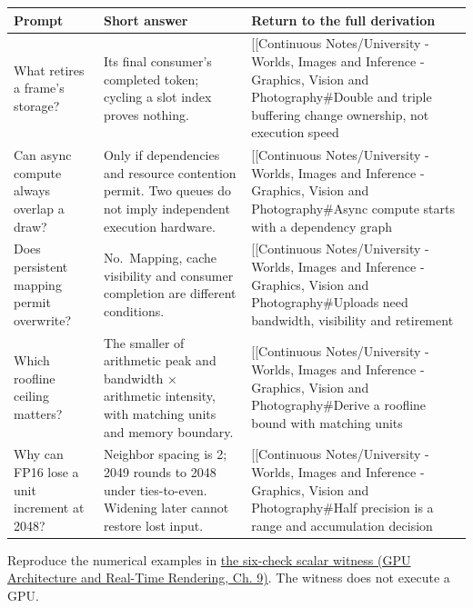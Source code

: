 \hypertarget{appendix-a8f634b076b5-buffering-budget-and-precision-in-five-answers}{}

{\def\LTcaptype{none} %
\begin{longtable}[]{@{}
  >{\raggedright\arraybackslash}p{}
  >{\raggedright\arraybackslash}p{}
  >{\raggedright\arraybackslash}p{}@{}}
\toprule\noalign{}
\begin{minipage}[b]{\linewidth}\raggedright
Prompt
\end{minipage} & \begin{minipage}[b]{\linewidth}\raggedright
Short answer
\end{minipage} & \begin{minipage}[b]{\linewidth}\raggedright
Return to the full derivation
\end{minipage} \\
\midrule\noalign{}
\endhead
\bottomrule\noalign{}
\endlastfoot
What retires a frame's storage? & Its final consumer's completed token; cycling a slot index proves nothing. & {[}{[}Continuous Notes/University - Worlds, Images and Inference - Graphics, Vision and Photography\#Double and triple buffering change ownership, not execution speed \\
Can async compute always overlap a draw? & Only if dependencies and resource contention permit. Two queues do not imply independent execution hardware. & {[}{[}Continuous Notes/University - Worlds, Images and Inference - Graphics, Vision and Photography\#Async compute starts with a dependency graph \\
Does persistent mapping permit overwrite? & No.~Mapping, cache visibility and consumer completion are different conditions. & {[}{[}Continuous Notes/University - Worlds, Images and Inference - Graphics, Vision and Photography\#Uploads need bandwidth, visibility and retirement \\
Which roofline ceiling matters? & The smaller of arithmetic peak and bandwidth × arithmetic intensity, with matching units and memory boundary. & {[}{[}Continuous Notes/University - Worlds, Images and Inference - Graphics, Vision and Photography\#Derive a roofline bound with matching units \\
Why can FP16 lose a unit increment at 2048? & Neighbor spacing is 2; 2049 rounds to 2048 under ties-to-even. Widening later cannot restore lost input. & {[}{[}Continuous Notes/University - Worlds, Images and Inference - Graphics, Vision and Photography\#Half precision is a range and accumulation decision \\
\end{longtable}
}

Reproduce the numerical examples in \href{../06-GPU-Architecture-and-Real-Time-Rendering/main.pdf\#nameddest=03-visual-computing-i-ch016-check-the-scheduling-and-precision-examples-with-a-scalar-witness}{the six-check scalar witness (GPU Architecture and Real-Time Rendering, Ch. 9)}. The witness does not execute a GPU.
